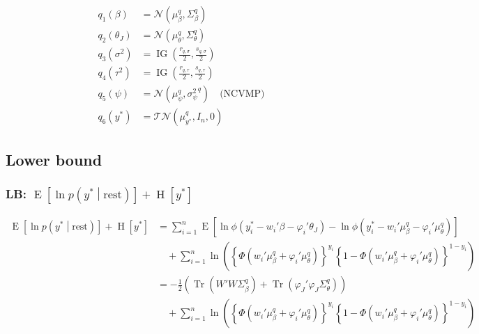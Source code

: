\documentclass[11pt]{article}
\DeclareMathOperator{\Tr}{Tr}
\newcommand{\opn}{\operatorname}
\begin{document}
\begin{align*}
  q_{1}\left(\beta\right) &= \mathcal{N}\left(\mu_{\beta}^{q}, \Sigma_{\beta}^{q}\right)\\
  q_{2}\left(\theta_{J}\right) &= \mathcal{N}\left(\mu_{\theta}^{q},\Sigma_{\theta}^{q}\right)\\
  q_{3}\left(\sigma^{2}\right) &= \opn{IG}\left(\frac{r_{q,\sigma}}{2},\frac{s_{q,\sigma}}{2}\right)\\
  q_{4}\left(\tau^{2}\right) &= \opn{IG}\left(\frac{r_{q,\tau}}{2},\frac{s_{q,\tau}}{2}\right)\\
  q_{5}\left(\psi\right) &= \mathcal{N}\left(\mu_{\psi}^{q}, {\sigma_{\psi}^{2}}^{q}\right) \quad \text{(NCVMP)}\\
  q_{6}\left(y^{*}\right) &= \mathcal{TN}\left(\mu_{y^{*}}^{q}, I_{n},0\right)
\end{align*}
\subsection{Lower bound}
\subsubsection{LB: $\opn{E}\left[\ln p\left(y^{*}\middle|\text{rest}\right)\right]+\opn{H}\left[y^{*}\right]$}
\begin{align*}
  \opn{E}\left[\ln p\left(y^{*}\middle|\text{rest}\right)\right]+\opn{H}\left[y^{*}\right] &= \sum_{i=1}^{n}\opn{E}\left[\ln \phi\left(y_{i}^{*}-w_{i}'\beta-\varphi_{i}'\theta_{J}\right)-\ln \phi\left(y_{i}^{*}-w_{i}'\mu_{\beta}^{q}-\varphi_{i}'\mu_{\theta}^{q}\right) \right]\\
  &\quad +\sum_{i=1}^{n}\ln\left(\left\{\Phi\left(w_{i}'\mu_{\beta}^{q}+\varphi_{i}'\mu_{\theta}^{q}\right) \right\}^{y_{i}}\left\{1-\Phi\left(w_{i}'\mu_{\beta}^{q}+\varphi_{i}'\mu_{\theta}^{q}\right) \right\}^{1-y_{i}} \right)\\
  &= -\frac{1}{2}\left(\Tr\left(W'W\Sigma_{\beta}^{q}\right)+\Tr\left(\varphi_{J}'\varphi_{J}\Sigma_{\theta}^{q}\right)\right)\\
  &\quad +\sum_{i=1}^{n}\ln\left(\left\{\Phi\left(w_{i}'\mu_{\beta}^{q}+\varphi_{i}'\mu_{\theta}^{q}\right) \right\}^{y_{i}}\left\{1-\Phi\left(w_{i}'\mu_{\beta}^{q}+\varphi_{i}'\mu_{\theta}^{q}\right) \right\}^{1-y_{i}} \right)
\end{align*}
\end{document}
